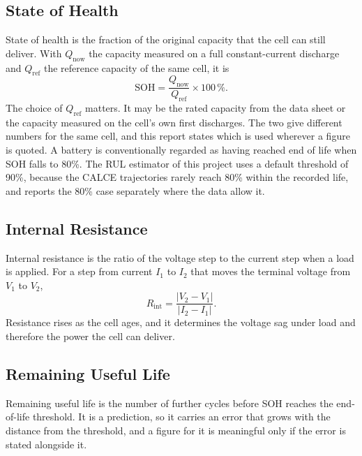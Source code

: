 \subsection{State of Health}

State of health is the fraction of the original capacity that the cell can still deliver. With $Q_{\mathrm{now}}$ the capacity measured on a full constant-current discharge and $Q_{\mathrm{ref}}$ the reference capacity of the same cell, it is
\begin{equation}
	\mathrm{SOH} = \frac{Q_{\mathrm{now}}}{Q_{\mathrm{ref}}} \times 100\,\%.
	\label{eq:sohdef}
\end{equation}
The choice of $Q_{\mathrm{ref}}$ matters. It may be the rated capacity from the data sheet or the capacity measured on the cell's own first discharges. The two give different numbers for the same cell, and this report states which is used wherever a figure is quoted. A battery is conventionally regarded as having reached end of life when SOH falls to 80\%. The RUL estimator of this project uses a default threshold of 90\%, because the CALCE trajectories rarely reach 80\% within the recorded life, and reports the 80\% case separately where the data allow it.

\subsection{Internal Resistance}

Internal resistance is the ratio of the voltage step to the current step when a load is applied. For a step from current $I_{1}$ to $I_{2}$ that moves the terminal voltage from $V_{1}$ to $V_{2}$,
\begin{equation}
	R_{\mathrm{int}} = \frac{\left|V_{2}-V_{1}\right|}{\left|I_{2}-I_{1}\right|}.
	\label{eq:rintdef}
\end{equation}
Resistance rises as the cell ages, and it determines the voltage sag under load and therefore the power the cell can deliver.

\subsection{Remaining Useful Life}

Remaining useful life is the number of further cycles before SOH reaches the end-of-life threshold. It is a prediction, so it carries an error that grows with the distance from the threshold, and a figure for it is meaningful only if the error is stated alongside it.

